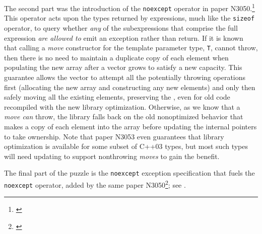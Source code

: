 The second part was the introduction of the \lstinline!noexcept! operator
in paper N3050.\footnote{\cite{abrahams10}} This
operator acts upon the types returned by expressions, much like the
\lstinline!sizeof! operator, to query whether \emph{any} of the
subexpressions that comprise the full expression \emph{are allowed to}
emit an exception rather than return. If it is known that calling a
\emph{move} constructor for the template parameter type, \lstinline!T!,
cannot throw, then there is no need to maintain a duplicate copy of each
element when populating the new array after a vector grows to satisfy a
new capacity. This guarantee allows the vector to attempt all the
potentially throwing operations first (allocating the new array and
constructing any new elements) and only then safely moving all the
existing elements, preserving the , even for old code recompiled with the new library
optimization. Otherwise, as we know that a \emph{move can} throw, the
library falls back on the old nonoptimized behavior that makes a copy of
each element into the array before updating the internal pointers to
take ownership. Note that paper N3053 even guarantees that library
optimization is available for some subset of C++03 types, but most such
types will need updating to support nonthrowing \emph{moves} to gain the
benefit.

The final part of the puzzle is the \lstinline!noexcept! exception
specification that fuels the \lstinline!noexcept! operator, added by the
same paper N3050\footnote{\cite{abrahams10}}; see .


